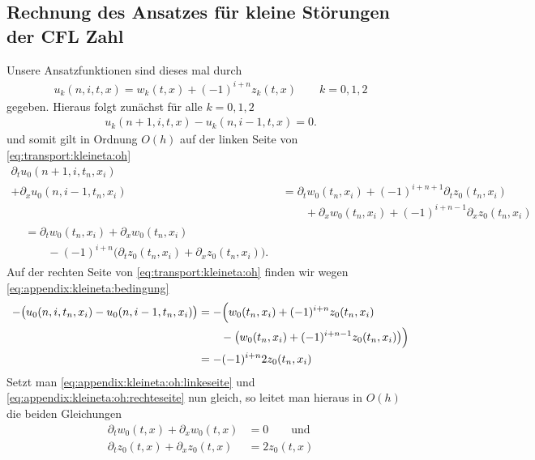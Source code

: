 \subsection{Rechnung des Ansatzes für kleine Störungen der CFL Zahl}
\label{appendix:kleineta:rechnung}
Unsere Ansatzfunktionen sind dieses mal durch
\begin{align} u_k(n, i, t, x) = w_k(t,x) + (-1)^{i+n} z_k(t, x) \qquad k = 0,1,2 \end{align}
gegeben. Hieraus folgt zunächst für alle $k = 0,1,2$
\begin{align}\label{eq:appendix:kleineta:bedingung}
u_k(n+1, i, t, x) - u_k(n, i-1, t, x) = 0.
\end{align}
und somit gilt in Ordnung $O(h)$ auf der linken Seite von \eqref{eq:transport:kleineta:oh}
\begin{align}\label{eq:appendix:kleineta:oh:linkeseite}
\partial_t u_0(n+1, i, t_n, x_i) \qquad&\nonumber \\
+ \partial_x u_0(n, i-1, t_n, x_i) &= \partial_t w_0(t_n,x_i) + (-1)^{i+n+1} \partial_t z_0(t_n,x_i)\nonumber\\
&\qquad + \partial_x w_0(t_n,x_i) + (-1)^{i+n-1} \partial_x z_0(t_n,x_i)\nonumber\\
\begin{split}
&= \partial_t w_0(t_n,x_i) + \partial_x w_0(t_n,x_i) \\
&\qquad - (-1)^{i+n} \bigl( \partial_t z_0(t_n,x_i) + \partial_x z_0(t_n,x_i) \bigr).
\end{split}
\end{align}
Auf der rechten Seite von \eqref{eq:transport:kleineta:oh} finden wir wegen \eqref{eq:appendix:kleineta:bedingung}
\begin{align}\label{eq:appendix:kleineta:oh:rechteseite}
- \bigl( u_0(n, i, t_n, x_i) - u_0(n, i-1, t_n, x_i) \bigr) &= -\Bigl( w_0(t_n, x_i) + (-1)^{i+n} z_0(t_n, x_i)\nonumber\\
&\qquad - \bigl( w_0(t_n, x_i) + (-1)^{i+n-1} z_0(t_n, x_i) \bigr) \Bigr) \nonumber\\
&= - (-1)^{i+n} 2 z_0(t_n,x_i) 
\end{align}
Setzt man \eqref{eq:appendix:kleineta:oh:linkeseite} und \eqref{eq:appendix:kleineta:oh:rechteseite} nun gleich, so leitet man hieraus in $O(h)$ die beiden Gleichungen
\begin{align}\label{eq:appendix:kleineta:oh}
\partial_t w_0(t,x) + \partial_x w_0(t,x) &= 0 \qquad \text{und}\\
\partial_t z_0(t,x) + \partial_x z_0(t,x) &= 2 z_0(t,x)
\end{align}
